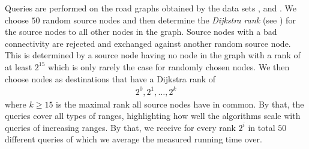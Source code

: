 	Queries are performed on the road graphs obtained by the data sets \freiburgR, \stuttgartR and \switzerlandR.
	We choose $50$ random source nodes and then determine the \textit{Dijkstra rank} (see )
	for the source nodes to all other nodes in the graph. Source nodes with a bad connectivity are rejected and exchanged
	against another random source node. This is determined by a source node having no node in the graph with a rank of at
	least $2^{15}$ which is only rarely the case for randomly chosen nodes.
	We then choose nodes as destinations that have a Dijkstra rank of
	\begin{align*}
		2^0, 2^1, \ldots, 2^k
	\end{align*}
	where $k \ge 15$ is the maximal rank all source nodes have in common. By that, the queries cover all types of
	ranges, highlighting how well the algorithms scale with queries of increasing ranges.
	By that, we receive for every rank $2^i$ in total $50$ different queries of which we average the
	measured running time over.\\
